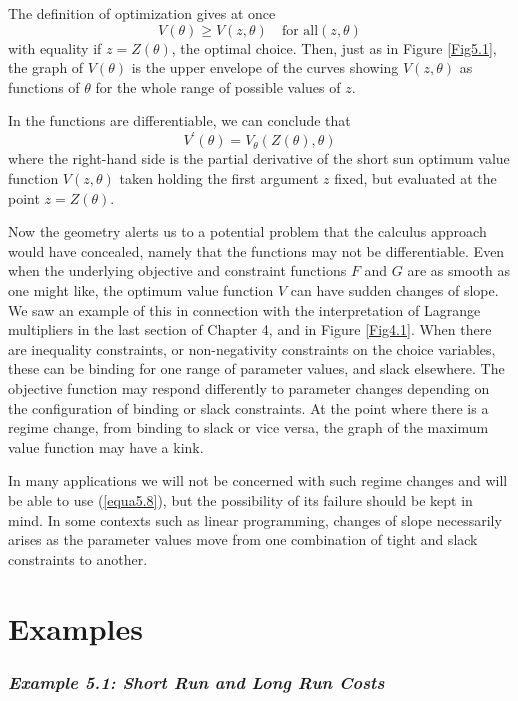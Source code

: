The definition of optimization gives at once
\begin{equation*}
   V(\theta) \geq V(z,\theta) \quad \mbox{for all} (z,\theta)
\end{equation*}
with equality if $z=Z(\theta)$, the optimal choice. Then, just as in Figure \ref{Fig5.1}, the graph of $V(\theta)$ is the upper envelope of the curves showing $V(z,\theta)$ as functions of $\theta$ for the whole range of possible values of $z$.

In the functions are differentiable, we can conclude that
\begin{equation} \label{equa5.8}
   V^\prime(\theta) = V_\theta(Z(\theta), \theta)
\end{equation}
where the right-hand side is the partial derivative of the short sun optimum value function $V(z, \theta)$ taken holding the first argument $z$ fixed, but evaluated at the point $z=Z(\theta)$.

Now the geometry alerts us to a potential problem that the calculus approach would have concealed, namely that the functions may not be differentiable. Even when the underlying objective and constraint functions $F$ and $G$ are as smooth as one might like, the optimum value function $V$ can have sudden changes of slope. We saw an example of this in connection with the interpretation of Lagrange multipliers in the last section of Chapter 4, and in Figure \ref{Fig4.1}. When there are inequality constraints, or non-negativity constraints on the choice variables, these can be binding for one range of parameter values, and slack elsewhere. The objective function may respond differently to parameter changes depending on the configuration of binding or slack constraints. At the point where there is a regime change, from binding to slack or vice versa, the graph of the maximum value function may have a kink.

In many applications we will not be concerned with such regime changes and will be able to use (\ref{equa5.8}), but the possibility of its failure should be kept in mind. In some contexts such as linear programming, changes of slope necessarily arises as the parameter values move from one combination of tight and slack constraints to another.

\section*{Examples}

\subsubsection*{\textit{Example 5.1: Short Run and Long Run Costs}}

